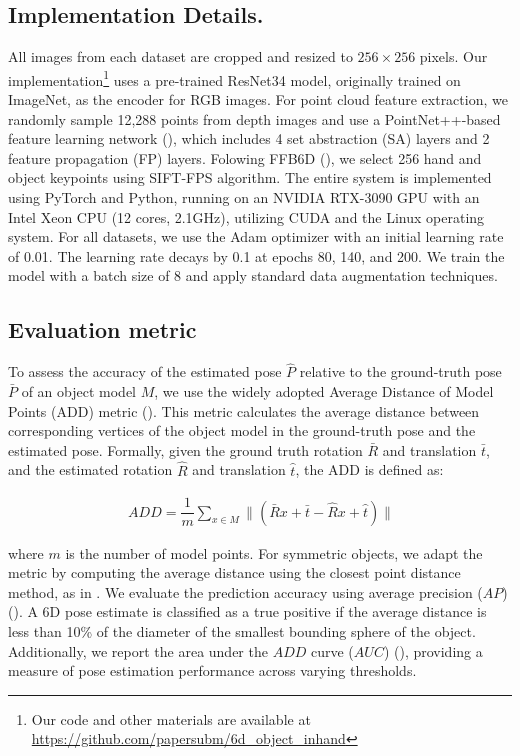 \subsection{\textbf{Implementation Details.}}

All images from each dataset are cropped and resized to $256 \times 256$ pixels. Our implementation\footnote{Our code and other materials are available at \url{https://github.com/papersubm/6d_object_inhand}} uses a pre-trained ResNet34 model, originally trained on ImageNet, as the encoder for RGB images. For point cloud feature extraction, we randomly sample 12,288 points from depth images and use a PointNet++-based feature learning network (\cite{qi2017pointnet++}), which includes 4 set abstraction (SA) layers and 2 feature propagation (FP) layers. Folowing FFB6D (\cite{he2021ffb6d}), we select 256 hand and object keypoints using SIFT-FPS algorithm. The entire system is implemented using PyTorch and Python, running on an NVIDIA RTX-3090 GPU with an Intel Xeon CPU (12 cores, 2.1GHz), utilizing CUDA and the Linux operating system. For all datasets, we use the Adam optimizer with an initial learning rate of 0.01. The learning rate decays by 0.1 at epochs 80, 140, and 200. We train the model with a batch size of 8 and apply standard data augmentation techniques.

\subsection{Evaluation metric}
\label{sec:metric}

To assess the accuracy of the estimated pose $\hat{P}$ relative to the ground-truth pose $\bar{P}$ of an object model $M$, we use the widely adopted Average Distance of Model Points (ADD) metric (\cite{hinterstoisser2012model}). This metric calculates the average distance between corresponding vertices of the object model in the ground-truth pose and the estimated pose. Formally, given the ground truth rotation $\bar{R}$ and translation $\bar{t}$, and the estimated rotation $\hat{R}$ and translation $\hat{t}$, the ADD is defined as:

\begin{align}
\  ADD = \dfrac{1}{m} \sum_{x \in M} \parallel (\bar{R}x+ \bar{t} - \hat{R}x+ \hat{t}) \parallel
\end{align}

\noindent where $m$ is the number of model points. For symmetric objects, we adapt the metric by computing the average distance using the closest point distance method, as in \cite{bregier2017symmetry}. We evaluate the prediction accuracy using average precision ($AP$) (\cite{bregier2017symmetry}). A 6D pose estimate is classified as a true positive if the average distance is less than 10\% of the diameter of the smallest bounding sphere of the object. Additionally, we report the area under the $ADD$ curve ($AUC$) (\cite{wang2019densefusion}), providing a measure of pose estimation performance across varying thresholds.

